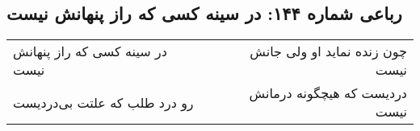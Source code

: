 \begin{center}
\section*{رباعی شماره ۱۴۴: در سینه کسی که راز پنهانش نیست}
\label{sec:sh144}
\begin{longtable}{l p{0.5cm} r}
در سینه کسی که راز پنهانش نیست
&&
چون زنده نماید او ولی جانش نیست
\\
رو درد طلب که علتت بی‌دردیست
&&
دردیست که هیچگونه درمانش نیست
\\
\end{longtable}
\end{center}
